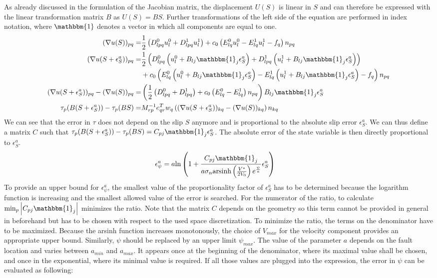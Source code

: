 As already discussed in the formulation of the Jacobian matrix, the displacement $U(S)$ is linear in $S$ and can therefore be expressed with the linear transformation matrix $B$ as $U(S) = BS$. Further transformations of the left side of the equation are performed in index notation, where $\mathbbm{1}$ denotes a vector in which all components are equal to one. 
\begin{align}
    (\nabla u(S))_{pq} =& \frac{1}{2}\left(D_{lpq}^0u_l^0 + D_{lpq}^1u_l^1\right) + c_0\left(E_{lq}^0u_l^0 - E_{lq}^1u_l^1 - f_q\right)n_{pq} \\ \nonumber
    (\nabla u(S + \epsilon_S^a))_{pq} =& \frac{1}{2}\left(D_{lpq}^0\left(u_l^0+ B_{lj}\mathbbm{1}_j\epsilon_S^a\right) + D_{lpq}^1\left(u_l^1+ B_{lj}\mathbbm{1}_j\epsilon_S^a\right)\right) \\ &+ c_0\left(E_{lq}^0\left(u_l^0+ B_{lj}\mathbbm{1}_j\epsilon_S^a\right) - E_{lq}^1\left(u_l^1+ B_{lj}\mathbbm{1}_j\epsilon_S^a\right) - f_q\right)n_{pq} \\
    (\nabla u(S + \epsilon_S^a))_{pq} - (\nabla u(S))_{pq} =& \left(\frac{1}{2}\left(D_{lpq}^0 + D_{lpq}^1\right) + c_0\left(E_{lq}^0 - E_{lq}^1\right)n_{pq}\right)B_{lj}\mathbbm{1}_j\epsilon_S^a \\
    \tau_p(B(S+\epsilon_S^a)) - \tau_p(BS) =& M_{rp}^{-1}e_{qr}^Tw_q\left((\nabla u(S + \epsilon_S^a))_{kq} - (\nabla u(S))_{kq}\right)n_{kq}
\end{align}
We can see that the error in $\tau$ does not depend on the slip $S$ anymore and is proportional to the absolute slip error $\epsilon_S^a$. We can thus define a matrix $C$ such that $\tau_p(B(S+\epsilon_S^a)) - \tau_p(BS) = C_{pj}\mathbbm{1}_j\epsilon_S^a$. The absolute error of the state variable is then directly proportional to $\epsilon_S^a$. 
\begin{align}
    \epsilon_\psi^a &= a\text{ln}\left(1+\frac{C_{pj}\mathbbm{1}_j}{a\sigma_n \text{arsinh}\left(\frac{V^*}{2V_0}\right)e^{\frac{\psi}{a}}}\epsilon_S^a\right) 
\end{align}
To provide an upper bound for $\epsilon_\psi^a$, the smallest value of the proportionality factor of $\epsilon_S^a$ has to be determined because the logarithm function is increasing and the smallest allowed value of the error is searched. For the numerator of the ratio, to calculate $\min_p\left|C_{pj}\mathbbm{1}_j\right|$ minimizes the ratio. Note that the matrix $C$ depends on the geometry so this term cannot be provided in general in beforehand but has to be chosen with respect to the used space discretization. To minimize the ratio, the terms on the denominator have to be maximized. Because the arsinh function increases monotonously, the choice of $V_{max}$ for the velocity component provides an appropriate upper bound. Similarly, $\psi$ should be replaced by an upper limit $\psi_{max}$. The value of the parameter $a$ depends on the fault location and varies between $a_{min}$ and $a_{max}$. It appears once at the beginning of the denominator, where its maximal value shall be chosen, and once in the exponential, where its minimal value is required. If all those values are plugged into the expression, the error in $\psi$ can be evaluated as following: 

